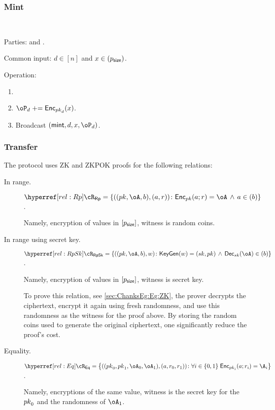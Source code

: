 \subsubsection{Mint}

\begin{protocol}~\label{prot:ConfidentialTransactions:Mint}
	\item[Parties:] \Mc and \Cc.
	
	
	
	\item[Common input:]  $d\in [n]$ and $x\in (p_{\mathsf{size}})$.
	
	\item[Operation:]  \Cc~
		\begin{enumerate}
			\item {}
			
			\item  $\oP_d \pluseq \Enc_{\pk_d}(x)$.
				
			
			\item Broadcast 	 	$(\mint,d,x,\oP_d)$.
		
	\end{enumerate}
\end{protocol}

\subsubsection{Transfer}

The protocol uses ZK and ZKPOK proofs for the   following  relations:

\begin{description}
	\item[In range.] $\rRp =\rRpDef$.\label{rel:Rp}
	
	Namely, encryption of values in $[p_{\mathsf{size}}]$, witness is random coins.
	
		\item[In range using secret key.] $\rRpSk =\rRpSkDef$.\label{rel:RpSk}
		
		
		Namely, encryption of values in $[p_{\mathsf{size}}]$, witness is secret key. 
		\begin{remark}
			To prove this relation, see \cref{sec:ChanksEg:Eg:ZK}, the prover decrypts the ciphertext, encrypt it again using fresh randomness, and use this randomness as the witness for the proof above. By storing the random coins used to generate the original ciphertext, one significantly reduce the proof's cost.
		\end{remark}
		
	\item[Equality.] $\rEq =\rEqDef$. \label{rel:Eq}
	
	Namely,   encryptions of the same value, witness is the  secret key for the ${pk}_0$ and the randomness of  $\oA_1$.
	

\end{description}




